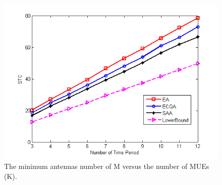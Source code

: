 \documentclass[journal]{IEEEtran}
\begin{document}
\begin{figure}[t]
	\centering
	\includegraphics[width=1\linewidth]{Fig4(c).png}
	\caption{The minimum antennas number of M versus the number of MUEs (K).}
	\label{fig:figure5}
\end{figure}
\end{document}
